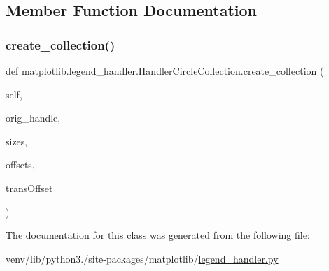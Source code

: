 \subsection{Member Function Documentation}
\mbox{\label{classmatplotlib_1_1legend__handler_1_1HandlerCircleCollection_af221047c204befc67a40801a0b4b6db6}} 
\subsubsection{\texorpdfstring{create\+\_\+collection()}{create\_collection()}}
{\footnotesize\ttfamily def matplotlib.\+legend\+\_\+handler.\+Handler\+Circle\+Collection.\+create\+\_\+collection (\begin{DoxyParamCaption}\item[{}]{self,  }\item[{}]{orig\+\_\+handle,  }\item[{}]{sizes,  }\item[{}]{offsets,  }\item[{}]{trans\+Offset }\end{DoxyParamCaption})}



The documentation for this class was generated from the following file\+:\begin{DoxyCompactItemize}
\item 
venv/lib/python3./site-\/packages/matplotlib/\hyperlink{legend__handler_8py}{legend\+\_\+handler.\+py}\end{DoxyCompactItemize}
